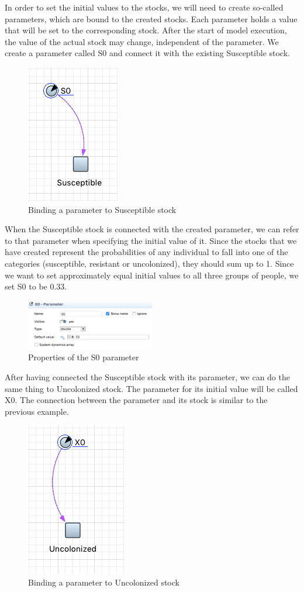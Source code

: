 In order to set the initial values to the stocks, we will need to create so-called parameters, which are bound to the created stocks. Each parameter holds a value that will be set to the corresponding stock. After the start of model execution, the value of the actual stock may change, independent of the parameter. We create a parameter called S0 and connect it with the existing Susceptible stock.

\begin{figure}[!ht]
  \centering
  \includegraphics[height=0.3\textwidth]{img/screens/basic/basic8}
  \caption{Binding a parameter to Susceptible stock}
\end{figure}

When the Susceptible stock is connected with the created parameter, we can refer to that parameter when specifying the initial value of it. Since the stocks that we have created represent the probabilities of any individual to fall into one of the categories (susceptible, resistant or uncolonized), they should sum up to 1. Since we want to set approximately equal initial values to all three groups of people, we set S0 to be 0.33.

\begin{figure}[!ht]
  \centering
  \includegraphics[width=0.5\textwidth]{img/screens/basic/basic7}
  \caption{Properties of the S0 parameter}
\end{figure}

After having connected the Susceptible stock with its parameter, we can do the same thing to Uncolonized stock. The parameter for its initial value will be called X0. The connection between the parameter and its stock is similar to the previous example.

\begin{figure}[!ht]
  \centering
  \includegraphics[height=0.3\textwidth]{img/screens/basic/basic9}
  \caption{Binding a parameter to Uncolonized stock}
\end{figure}

